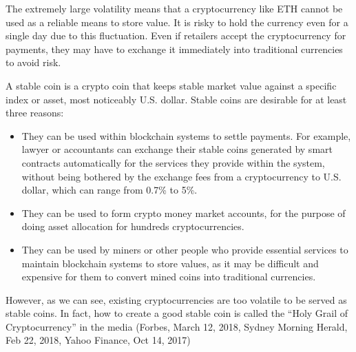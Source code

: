 \documentclass[11pt]{article}%
\numberwithin{equation}{section}
\theoremstyle{plain}
\begin{document}
The extremely large volatility means that a cryptocurrency like ETH cannot be used as a reliable means to store value. It is risky to hold the currency even for a single day due to this fluctuation. Even if retailers accept the cryptocurrency for payments, they may have to exchange it immediately into traditional currencies to avoid risk.



A stable coin is a crypto coin that keeps stable market value against a specific index or asset, most noticeably U.S. dollar. Stable coins are desirable for at least three reasons:
\begin{itemize}
\item They can be used within blockchain systems to settle payments. For example, lawyer or accountants can exchange their stable coins generated by smart contracts automatically for the services they provide within the system, without being bothered by the exchange fees from a cryptocurrency to U.S. dollar, which can range from 0.7\% to 5\%.
\item  They can be used to form crypto money market accounts, for the purpose of doing asset allocation for hundreds cryptocurrencies.
\item They can be used by miners or other people who provide essential services to maintain blockchain systems to store values, as it may be difficult and expensive for them to convert mined coins into traditional currencies.
\end{itemize}
However, as we can see, existing cryptocurrencies are too volatile to be served as stable coins.
In fact, how to create a good stable coin is called the ``Holy Grail of Cryptocurrency'' in the media (Forbes, March 12, 2018,
Sydney Morning Herald, Feb 22, 2018, Yahoo Finance, Oct 14, 2017)
\end{document}
